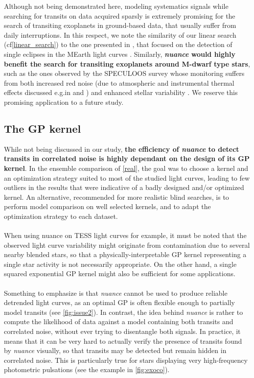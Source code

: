 \documentclass[modern]{aastex631}
\newcommand{\nuancemethod}{\textit{nuance}}
\newcommand{\nuancecode}{\textsf{nuance}}
\begin{document}
Although not being demonstrated here, modeling systematics signals while searching for transits on data acquired sparsly is extremely promising for the search of transiting exoplanets in ground-based data, that usually suffer from daily interruptions. In this respect, we note the similarity of our linear search (cf\;\autoref{linear_search}) to the one presented in \citealt{Berta2012}, that focused on the detection of single eclipses in the MEarth light curves \citep{Irwin2009}. Similarly, \textbf{\nuancemethod{} would highly benefit the search for transiting exoplanets around M-dwarf type stars}, such as the ones observed by the SPECULOOS survey \citep{speculoos} whose monitoring suffers from both increased red noise (due to atmospheric and instrumental thermal effects discussed e.g.\;in \citealt{Berta2012} and  \citealt{Pedersen2023}) and enhanced stellar variability \citep{Murray2020}. We reserve this promising application to a future study.

\subsection{The GP kernel}
While not being discussed in our study, \textbf{the efficiency of \nuancemethod{} to detect transits in correlated noise is highly dependant on the design of its GP kernel}. In the ensemble comparison of \autoref{real}, the goal was to choose a kernel and an optimization strategy suited to most of the studied light curves, leading to few outliers in the results that were indicative of a badly designed and/or optimized kernel. An alternative, recommended for more realistic blind searches, is to perform model comparison on well selected kernels, and to adapt the optimization strategy to each dataset.\\\\
When using \nuancecode{} on TESS light curves for example, it must be noted that the observed light curve variability might originate from contamination due to several nearby blended stars, so that a physically-interpretable GP kernel representing a single star activity is not necessarily appropriate. On the other hand, a single squared exponential GP kernel might also be sufficient for some applications.\\\\
Something to emphasize is that \nuancemethod{} cannot be used to produce reliable detrended light curves, as an optimal GP is often flexible enough to partially model transits (see \autoref{fig:issue2}). 
In contrast, the idea behind \nuancemethod{} is rather to compute the likelihood of data against a model containing both transits and correlated noise, without ever trying to disentangle both signals. In practice, it means that it can be very hard to actually verify the presence of transits found by \nuancemethod{} visually, so that transits may be detected but remain hidden in correlated noise. This is particularly true for stars displaying very high-frequency photometric pulsations (see the example in \autoref{fig:exoco}).
\end{document}
